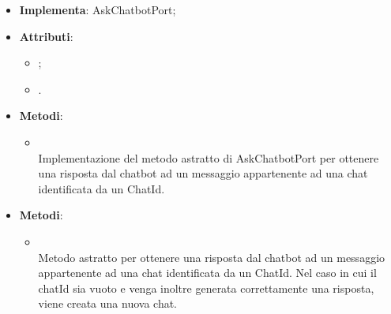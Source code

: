 \documentclass[10pt, a4paper]{article}
\begin{document}
\label{AskChatbotLangchainDettaglio}
\begin{itemize}
    \item \textbf{Implementa}: AskChatbotPort;
    \item \textbf{Attributi}:
    \begin{itemize}
        \item {};
        \item {}.
    \end{itemize}
    \item \textbf{Metodi}:
    \begin{itemize}
        \item {}\\
        Implementazione del metodo astratto di AskChatbotPort per ottenere una risposta dal chatbot ad un messaggio appartenente ad una chat identificata da un ChatId. %




    \end{itemize}
\end{itemize}

\label{AskChatbotPortDettaglio}
\begin{itemize}
    \item \textbf{Metodi}:
    \begin{itemize}
        \item {}\\
        Metodo astratto per ottenere una risposta dal chatbot ad un messaggio appartenente ad una chat identificata da un ChatId. Nel caso in cui il chatId sia vuoto e venga inoltre generata correttamente una risposta, viene creata una nuova chat.
    \end{itemize}
\end{itemize}
\end{document}
